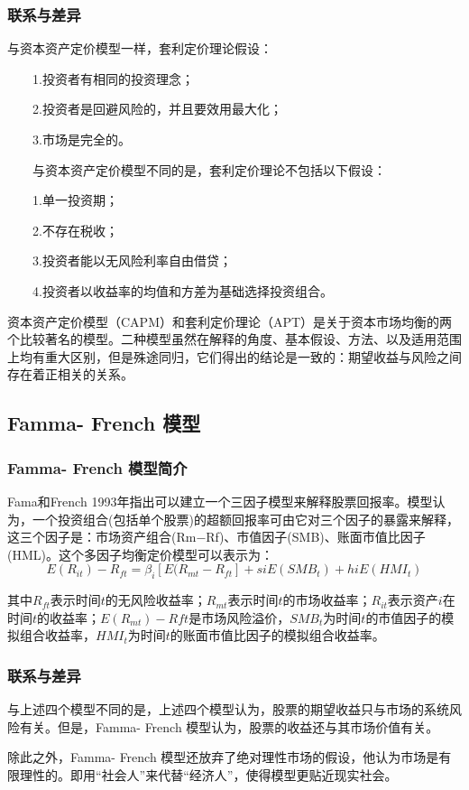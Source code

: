 \documentclass[UTF8]{ctexart}
\begin{document}
\subsubsection{联系与差异}
与资本资产定价模型一样，套利定价理论假设：

　　1.投资者有相同的投资理念；

　　2.投资者是回避风险的，并且要效用最大化；

　　3.市场是完全的。

　　与资本资产定价模型不同的是，套利定价理论不包括以下假设：

　　1.单一投资期；

　　2.不存在税收；

　　3.投资者能以无风险利率自由借贷；

　　4.投资者以收益率的均值和方差为基础选择投资组合。\par
资本资产定价模型（CAPM）和套利定价理论（APT）是关于资本市场均衡的两个比较著名的模型。二种模型虽然在解释的角度、基本假设、方法、以及适用范围上均有重大区别，但是殊途同归，它们得出的结论是一致的：期望收益与风险之间存在着正相关的关系。\par
\subsection{Famma-
French 模型}
\subsubsection{Famma-
French 模型简介}
Fama和French 1993年指出可以建立一个三因子模型来解释股票回报率。模型认为，一个投资组合(包括单个股票)的超额回报率可由它对三个因子的暴露来解释，这三个因子是：市场资产组合(Rm−Rf)、市值因子(SMB)、账面市值比因子(HML)。这个多因子均衡定价模型可以表示为：
$$E(R_{it})-R_{ft}=\beta_{i}[E(R_{mt}-R_{ft}]+siE(SMB_{t})+hiE(HMI_{t})$$\par
其中$R_{ft}$表示时间$t$的无风险收益率；$R_{mt}$表示时间$t$的市场收益率；$R_{it}$表示资产$i$在时间$t$的收益率；$E(R_{mt}) − Rft$是市场风险溢价，$SMB_{t}$为时间$t$的市值因子的模拟组合收益率，$HMI_{t}$为时间$t$的账面市值比因子的模拟组合收益率。\par
\subsubsection{联系与差异}
与上述四个模型不同的是，上述四个模型认为，股票的期望收益只与市场的系统风险有关。但是，Famma-
French 模型认为，股票的收益还与其市场价值有关。\par
除此之外，Famma-
French 模型还放弃了绝对理性市场的假设，他认为市场是有限理性的。即用“社会人”来代替“经济人”，使得模型更贴近现实社会。\par
\end{document}

